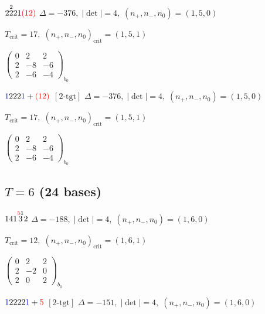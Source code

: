 \documentclass[10pt]{article}
\begin{document}
$2\overset{2}{2}21\textcolor{red}{(12)}$ \quad $\Delta=-376,\; |\det|=4,\; (n_+,n_-,n_0)=(1,5,0)$

\hspace{1em}$T_{\text{crit}}=17,\; (n_+,n_-,n_0)_{\text{crit}}=(1,5,1)$

\hspace{2em}$\left(\begin{smallmatrix}0 & 2 & 2 \\ 2 & -8 & -6 \\ 2 & -6 & -4\end{smallmatrix}\right)_{\!b_0}$

\smallskip

$\textcolor{blue}{1}222\textcolor{blue}{1}+\textcolor{red}{(12)}$ $\scriptstyle [2\text{-tgt}]$ \quad $\Delta=-376,\; |\det|=4,\; (n_+,n_-,n_0)=(1,5,0)$

\hspace{1em}$T_{\text{crit}}=17,\; (n_+,n_-,n_0)_{\text{crit}}=(1,5,1)$

\hspace{2em}$\left(\begin{smallmatrix}0 & 2 & 2 \\ 2 & -8 & -6 \\ 2 & -6 & -4\end{smallmatrix}\right)_{\!b_0}$


\subsection*{$T = 6$ \quad (24 bases)}
\smallskip

$141\overset{\textcolor{red}{5}1}{3}2$ \quad $\Delta=-188,\; |\det|=4,\; (n_+,n_-,n_0)=(1,6,0)$

\hspace{1em}$T_{\text{crit}}=12,\; (n_+,n_-,n_0)_{\text{crit}}=(1,6,1)$

\hspace{2em}$\left(\begin{smallmatrix}0 & 2 & 2 \\ 2 & -2 & 0 \\ 2 & 0 & 2\end{smallmatrix}\right)_{\!b_0}$

\smallskip

$\textcolor{blue}{1}2222\textcolor{blue}{1}+\textcolor{red}{5}$ $\scriptstyle [2\text{-tgt}]$ \quad $\Delta=-151,\; |\det|=4,\; (n_+,n_-,n_0)=(1,6,0)$
\end{document}
